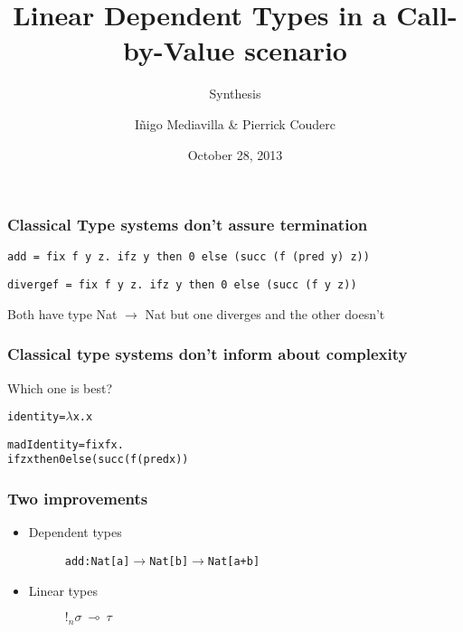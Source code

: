 \documentclass{beamer}
\title{Linear Dependent Types in a Call-by-Value scenario}
\subtitle{Synthesis}
\author{I\~{n}igo Mediavilla \& Pierrick Couderc}
\date{October 28, 2013}
\begin{document}
\begin{frame}
  \maketitle
\end{frame}

\begin{frame}[fragile]
\frametitle{Classical Type systems don't assure termination}


\begin{verbatim}
add = fix f y z. ifz y then 0 else (succ (f (pred y) z))
\end{verbatim}

\begin{verbatim}
divergef = fix f y z. ifz y then 0 else (succ (f y z))
\end{verbatim}
Both have type Nat $\rightarrow$ Nat but one diverges and the other doesn't
\end{frame}

\begin{frame}[fragile]
  \frametitle{Classical type systems don't inform about complexity}
  Which one is best? 
  \begin{alltt}
    identity = \(\lambda\)x. x 
  \end{alltt}
  \begin{alltt}
    madIdentity = fix f x. 
                    ifz x then 0 else (succ (f (pred x))
  \end{alltt}
\end{frame}

\begin{frame}[fragile]
  \frametitle{Two improvements}
  \begin{itemize}
  \item Dependent types
    \begin{figure}
\begin{alltt}
 add : Nat[a] \(\rightarrow\) Nat[b] \(\rightarrow\) Nat[a+b]
\end{alltt}
    \end{figure}
  \item Linear types \\
    \begin{figure}
      \begin{center}
        $!_{n} \sigma ~\multimap~\tau$
      \end{center}
    \end{figure}
  \end{itemize}
\end{frame}
\end{document}
